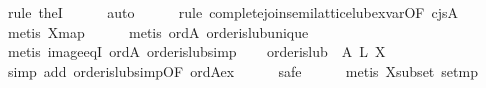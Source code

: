 \begin{isabellebody}
\ {}rule\ the{}I{}{}\isanewline
\ \ \ \ \isamarkupfalse%
\ auto\isanewline
\ \ \ \ \isamarkupfalse%
\ {}rule\ complete{}join{}semilattice{}lub{}ex{}var{}{}OF\ cjs{}A{}{}\isanewline
\ \ \ \ \isamarkupfalse%
\ {}metis\ X{}map{}\isanewline
\ \ \ \ \isamarkupfalse%
\ {}metis\ ord{}A\ order{}is{}lub{}unique{}\isanewline
\ \ \ \ \isamarkupfalse%
\ {}metis\ image{}eqI\ ord{}A\ order{}is{}lub{}simp{}\isanewline
\isanewline
\ \ \isamarkupfalse%
\ {}order{}is{}lub\ {}{}\ A{}\ {}L\ X{}\isanewline
\ \ \ \ \isamarkupfalse%
\ {}simp\ add{}\ order{}is{}lub{}simp{}OF\ ord{}A{}ex{}{}\isanewline
\ \ \ \ \isamarkupfalse%
\ safe\isanewline
\ \ \ \ \isamarkupfalse%
\ {}metis\ X{}subset\ set{}mp{}\isanewline
\ \ \ \ \isamarkupfalse%

\end{isabellebody}

